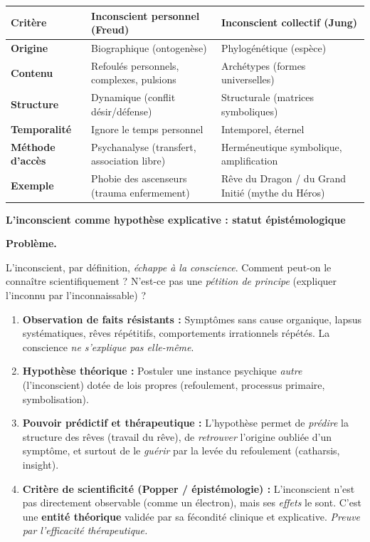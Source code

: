 \documentclass[11pt]{article}
\begin{document}
\begin{center}
\begin{tabularx}{\linewidth}{|l|X|X|}
\hline
\rowcolor{popblueL}
\textbf{Critère} & \textbf{Inconscient personnel (Freud)} & \textbf{Inconscient collectif (Jung)} \\
\hline
\textbf{Origine} & Biographique (ontogenèse) & Phylogénétique (espèce) \\
\hline
\textbf{Contenu} & Refoulés personnels, complexes, pulsions & Archétypes (formes universelles) \\
\hline
\textbf{Structure} & Dynamique (conflit désir/défense) & Structurale (matrices symboliques) \\
\hline
\textbf{Temporalité} & Ignore le temps personnel & Intemporel, éternel \\
\hline
\textbf{Méthode d'accès} & Psychanalyse (transfert, association libre) & Herméneutique symbolique, amplification \\
\hline
\textbf{Exemple} & Phobie des ascenseurs (trauma enfermement) & Rêve du Dragon / du Grand Initié (mythe du Héros) \\
\hline
\end{tabularx}
\end{center}

\textbf{L'inconscient comme hypothèse explicative : statut épistémologique}\par

\textbf{Problème.}\par L'inconscient, par définition, \emph{échappe à la conscience}. Comment peut-on le connaître scientifiquement ? N'est-ce pas une \emph{pétition de principe} (expliquer l'inconnu par l'inconnaissable) ?

\begin{methode}
\begin{enumerate}
    \item \textbf{Observation de faits résistants :} Symptômes sans cause organique, lapsus systématiques, rêves répétitifs, comportements irrationnels répétés. La conscience \emph{ne s'explique pas elle-même}.
    \item \textbf{Hypothèse théorique :} Postuler une instance psychique \emph{autre} (l'inconscient) dotée de lois propres (refoulement, processus primaire, symbolisation).
    \item \textbf{Pouvoir prédictif et thérapeutique :} L'hypothèse permet de \emph{prédire} la structure des rêves (travail du rêve), de \emph{retrouver} l'origine oubliée d'un symptôme, et surtout de le \emph{guérir} par la levée du refoulement (catharsis, insight).
    \item \textbf{Critère de scientificité (Popper / épistémologie) :} L'inconscient n'est pas directement observable (comme un électron), mais ses \emph{effets} le sont. C'est une \textbf{entité théorique} validée par sa fécondité clinique et explicative. \emph{Preuve par l'efficacité thérapeutique.}
\end{enumerate}
\end{methode}
\end{document}
